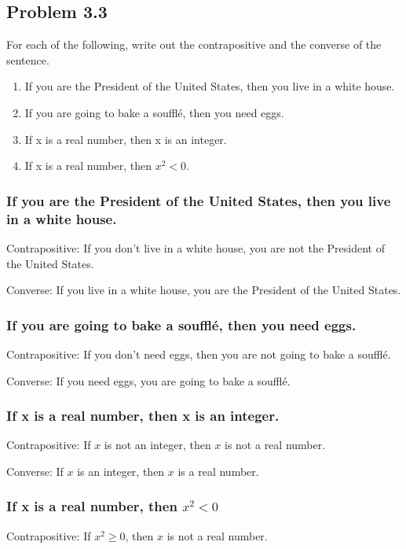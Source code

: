 \documentclass{article}
\begin{document}
\pagebreak
\subsection{Problem 3.3}
For each of the following, write out the contrapositive and the converse of the sentence.
\begin{enumerate}
	\item If you are the President of the United States, then you live in a white house.
	\item If you are going to bake a souffl\'e, then you need eggs.
	\item If x is a real number, then x is an integer.
	\item If x is a real number, then $x^2<0$.
\end{enumerate}

\subsubsection{If you are the President of the United States, then you live in a white house.}
Contrapositive: 
If you don't live in a white house, you are not the President of the United States.

Converse: 
If you live in a white house, you are the President of the United States.

\subsubsection{If you are going to bake a souffl\'e, then you need eggs.}
Contrapositive: 
If you don't need eggs, then you are not going to bake a souffl\'e.

Converse: 
If you need eggs, you are going to bake a souffl\'e.

\subsubsection{If x is a real number, then x is an integer.}
Contrapositive: 
If $x$ is not an integer, then $x$ is not a real number.

Converse: 
If $x$ is an integer, then $x$ is a real number.

\subsubsection{If x is a real number, then \boldmath $x^2<0$}
Contrapositive: 
If $x^2 \geq 0$, then $x$ is not a real number.
\end{document}

